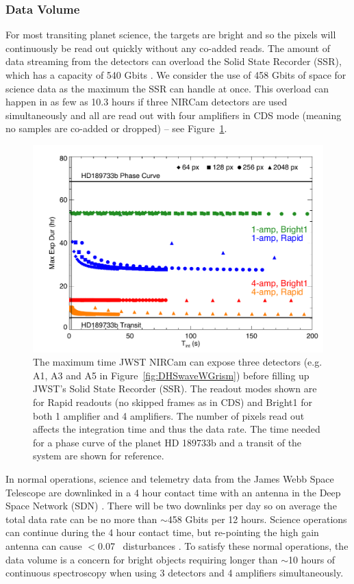 \documentclass[iop]{emulateapj}
\begin{document}
\subsubsection{Data Volume}
For most transiting planet science, the targets are bright and so the pixels will continuously be read out quickly without any co-added reads.
The amount of data streaming from the detectors can overload the Solid State Recorder (SSR), which has a capacity of 540 Gbits \citep{johns2008L2comm}.
We consider the use of 458 Gbits of space for science data as the maximum the SSR can handle at once.
This overload can happen in as few as 10.3 hours if three NIRCam detectors are used simultaneously and all are read out with four amplifiers in CDS mode (meaning no samples are co-added or dropped) -- see Figure~\ref{fig:DataVolume}.

\begin{figure}[!t]
\includegraphics[width=1.0\columnwidth]{NIRCam_grism_max_exp.pdf}
\caption{The maximum time JWST NIRCam can expose three detectors (e.g. A1, A3 and A5 in Figure~\ref{fig:DHSwaveWGrism}) before filling up JWST's Solid State Recorder (SSR). The readout modes shown are for Rapid readouts (no skipped frames as in CDS) and Bright1 for both 1 amplifier and 4 amplifiers. The number of pixels read out affects the integration time and thus the data rate. The time needed for a phase curve of the planet HD 189733b and a transit of the system are shown for reference.}\label{fig:DataVolume}
\end{figure}

In normal operations, science and telemetry data from the James Webb Space Telescope are downlinked in a 4 hour contact time with an antenna in the Deep Space Network (SDN)  \citep{dashevsky2008groundflight}.
There will be two downlinks per day so on average the total data rate can be no more than $\sim$458 Gbits per 12 hours.
Science operations can continue during the 4 hour contact time, but re-pointing the high gain antenna can cause $<$0.07 \arcsec\ disturbances \citep{beichman2014pasp}.
To satisfy these normal operations, the data volume is a concern for bright objects requiring longer than $\sim$10 hours of continuous spectroscopy when using 3 detectors and 4 amplifiers simultaneously.
\end{document}
